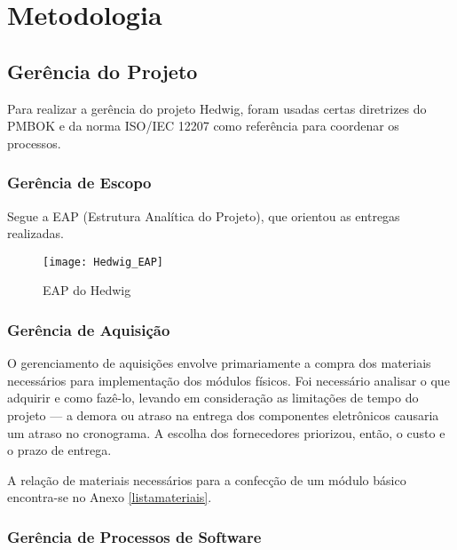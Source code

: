 \chapter{Metodologia}

\section{Gerência do Projeto}

Para realizar a gerência do projeto Hedwig, foram usadas certas diretrizes do PMBOK \cite{pmi} e da norma ISO/IEC 12207 \cite{iso12207} como referência para coordenar os processos.

\subsection{Gerência de Escopo}

Segue a EAP (Estrutura Analítica do Projeto), que orientou as entregas realizadas.

\begin{figure}[H]
	\centering
	\caption{EAP do Hedwig}
	\texttt{[image: Hedwig\_EAP]}
	\label{fig:Hedwig_EAP}
\end{figure}

\subsection{Gerência de Aquisição}

O gerenciamento de aquisições envolve primariamente a compra dos materiais necessários para implementação dos módulos físicos. Foi necessário analisar o que adquirir e como fazê-lo, levando em consideração as limitações de tempo do projeto --- a demora ou atraso na entrega dos componentes eletrônicos causaria um atraso no cronograma. A escolha dos fornecedores priorizou, então, o custo e o prazo de entrega.

A relação de materiais necessários para a confecção de um módulo básico encontra-se no Anexo \ref{listamateriais}.

\subsection{Gerência de Processos de Software}

